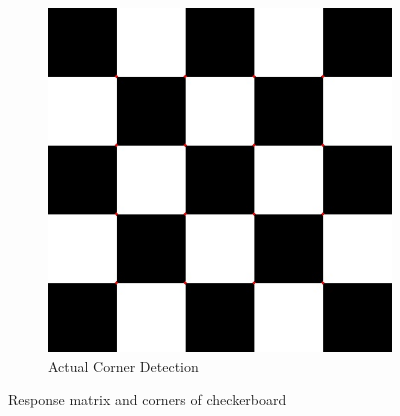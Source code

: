 \documentclass[12pt]{article}
\begin{document}
\begin{enumerate}
\begin{enumerate}
\begin{figure}[H]
\begin{subfigure}[t]{0.5\textwidth}
				\includegraphics[width=\textwidth]{checkerboard_corners_after_sup.jpg}
				\caption{Actual Corner Detection}
				\label{fig: 1ab}
			\end{subfigure}
			\caption{Response matrix and corners of checkerboard}
		\end{figure}
	

\end{enumerate}
\end{enumerate}
\end{document}
